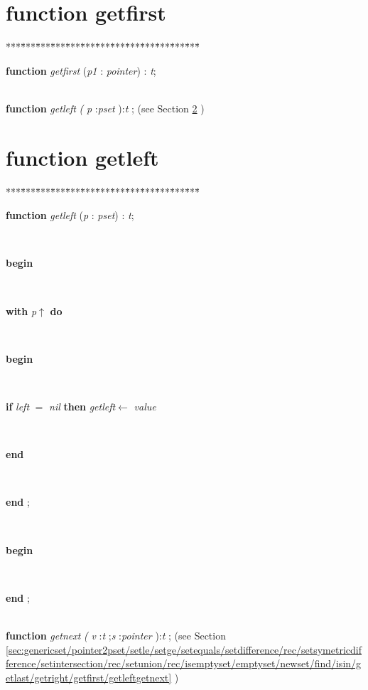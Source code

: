\documentclass[10pt, a4paper]{article}
\begin{document}
\section{function getfirst}\label{sec:genericset/pointer2pset/setle/setge/setequals/setdifference/rec/setsymetricdifference/setintersection/rec/setunion/rec/isemptyset/emptyset/newset/find/isin/getlast/getrightgetfirst}

\begin{tabbing}
***\=***\=***\=***\=***\=***\=***\=***\=***\=***\=***\=***\=***\=\kill
\parbox{14cm}{\textsf {\textbf {function } \textsf{\textit{getfirst} (\textit{p1} : \textit{pointer}) : \textit{t}}; }}\\
\+\textsf{\textbf{function}  \textit{getleft} \textit{(} \textit{p} :\textit{pset} ):\textit{t} ;} (see Section \ref{sec:genericset/pointer2pset/setle/setge/setequals/setdifference/rec/setsymetricdifference/setintersection/rec/setunion/rec/isemptyset/emptyset/newset/find/isin/getlast/getright/getfirstgetleft} )\\
\end{tabbing}
\section{function getleft}\label{sec:genericset/pointer2pset/setle/setge/setequals/setdifference/rec/setsymetricdifference/setintersection/rec/setunion/rec/isemptyset/emptyset/newset/find/isin/getlast/getright/getfirstgetleft}

\begin{tabbing}
***\=***\=***\=***\=***\=***\=***\=***\=***\=***\=***\=***\=***\=\kill
\parbox{14cm}{\textsf {\textbf {function } \textsf{\textit{getleft} (\textit{p} : \textit{pset}) : \textit{t}}; }}\\
\+\parbox{14cm}{\textsf{\textbf{begin} }}\\
\+\parbox{14cm}{\textsf {\textbf {with } \textsf{\textit{p}$\uparrow$\textit{}} \textbf{ do } }}\\
\<\parbox{14cm}{\textsf{\textbf{begin} }}\\
\+\parbox{14cm}{\textsf {\textbf {if } \textsf{\textit{left} $=$ \textit{nil}} \textbf{ then } \textsf{\textit{getleft}$\leftarrow$ \textit{value}}}}\\
\<\-\<\-\parbox{14cm}{\textsf{\textbf{end} }}\\
\<\-\parbox{14cm}{\textsf{\textbf{end} ;}}\\
\+\parbox{14cm}{\textsf{\textbf{begin} }}\\
\<\-\parbox{14cm}{\textsf{\textbf{end} ;}}\\
\+\textsf{\textbf{function}  \textit{getnext} \textit{(} \textit{v} :\textit{t} ;\textit{s} :\textit{pointer} ):\textit{t} ;} (see Section \ref{sec:genericset/pointer2pset/setle/setge/setequals/setdifference/rec/setsymetricdifference/setintersection/rec/setunion/rec/isemptyset/emptyset/newset/find/isin/getlast/getright/getfirst/getleftgetnext} )\\
\end{tabbing}
\end{document}

